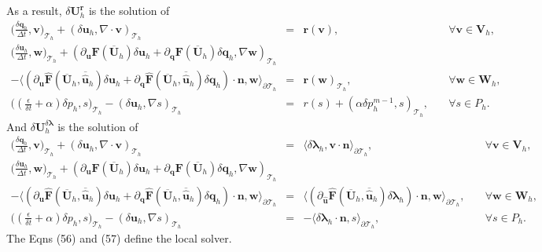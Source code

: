 \documentclass[11pt]{article}
\begin{document}
As a result, $\delta \bm{U}_h^{\bm{r}}$ is the solution of
\begin{equation}
\begin{array}{rcll}
\displaystyle  \Big(\frac{\delta \bm{q}_h}{\Delta t}, \bm{v}\Big)_{\mathcal{T}_h}  + (\delta \bm{u}_h, \nabla \cdot \bm{v})_{\mathcal{T}_h}   & = & \bm{r}(\bm{v}), & \quad \forall \bm{v} \in \bm{V}_h, \\[2ex] 
\displaystyle \Big(\frac{\delta \bm{u}_h}{\Delta t}, \bm{w} \Big)_{\mathcal{T}_h} + (\partial_{\bm{u}} \bm{F} (\overline{\bm{U}}_h) \delta \bm{u}_h + \partial_{\bm{q}} \bm{F} (\overline{\bm{U}}_h) \delta \bm{q}_h, \nabla \bm{w})_{\mathcal{T}_h} & & \\[2ex]
- \langle (\partial_{\bm{u}} \widehat{\bm{F}} (\overline{\bm{U}}_h,\overline{\widehat{\bm{u}}}_h) \delta \bm{u}_h + \partial_{{\bm{q}}} \widehat{\bm{F}} (\overline{\bm{U}}_h,\overline{\widehat{\bm{u}}}_h) \delta {\bm{q}}_h) \cdot \bm{n}, \bm{w} \rangle_{\partial \mathcal{T}_h}  & = &  \bm{r}(\bm{w})_{\mathcal{T}_h},  & \quad \forall \bm{w} \in \bm{W}_h, \\[2ex]
\displaystyle  \Big((\frac{\epsilon}{\delta t} + \alpha) \delta p_h, s\Big)_{\mathcal{T}_h} - (\delta \bm{u}_h, \nabla s)_{\mathcal{T}_h}   & = & r(s) +  (\alpha \delta p_h^{m-1}, s)_{\mathcal{T}_h}, & \quad \forall s \in P_h .
\end{array}
\end{equation}
And $\delta \bm{U}_h^{\delta \bm{\lambda}}$ is the solution of
\begin{equation}
\begin{array}{rcll}
\displaystyle  \Big(\frac{\delta \bm{q}_h}{\Delta t}, \bm{v}\Big)_{\mathcal{T}_h}  + (\delta \bm{u}_h, \nabla \cdot \bm{v})_{\mathcal{T}_h}   & = & \langle \delta {\bm{\lambda}}_h, \bm{v} \cdot \bm{n} \rangle_{\partial \mathcal{T}_h}, & \quad \forall \bm{v} \in \bm{V}_h, \\[2ex] 
\displaystyle \Big(\frac{\delta \bm{u}_h}{\Delta t}, \bm{w} \Big)_{\mathcal{T}_h} + (\partial_{\bm{u}} \bm{F} (\overline{\bm{U}}_h) \delta \bm{u}_h + \partial_{\bm{q}} \bm{F} (\overline{\bm{U}}_h) \delta \bm{q}_h, \nabla \bm{w})_{\mathcal{T}_h} & & \\[2ex]
- \langle (\partial_{\bm{u}} \widehat{\bm{F}} (\overline{\bm{U}}_h,\overline{\widehat{\bm{u}}}_h) \delta \bm{u}_h + \partial_{{\bm{q}}} \widehat{\bm{F}} (\overline{\bm{U}}_h,\overline{\widehat{\bm{u}}}_h) \delta {\bm{q}}_h) \cdot \bm{n}, \bm{w} \rangle_{\partial \mathcal{T}_h}  & = &  \langle (\partial_{\widehat{\bm{u}}} \widehat{\bm{F}} (\overline{\bm{U}}_h,  \overline{\widehat{\bm{u}}}_h) \delta {\bm{\lambda}}_h) \cdot \bm{n}, \bm{w} \rangle_{\partial \mathcal{T}_h} ,  & \quad \forall \bm{w} \in \bm{W}_h, \\[2ex]
\displaystyle  \Big((\frac{\epsilon}{\delta t} + \alpha) \delta p_h, s\Big)_{\mathcal{T}_h} - (\delta \bm{u}_h, \nabla s)_{\mathcal{T}_h}   & = &  -\langle \delta {\bm{\lambda}}_h \cdot \bm{n},s \rangle_{\partial \mathcal{T}_h} , & \quad \forall s \in P_h .
\end{array}
\end{equation}
The Eqns (56) and (57) define the local solver.
\end{document}
